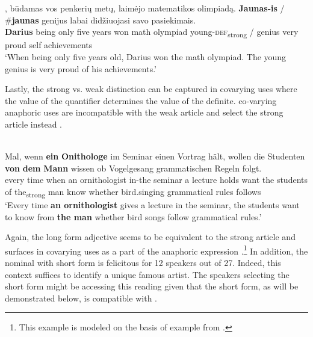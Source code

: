 \documentclass[output=paper,
modfonts
]{langscibook}
\begin{document}
\begin{exe}
	\ex \label{ex:sereikaite:42}
	, {būdamas} {vos} {penkerių} {metų}, {laimėjo} {matematikos} {olimpiadą}. \textbf{Jaunas-is} \textnormal{/} \textnormal{\#}\textbf{jaunas} {genijus} {labai} {didžiuojasi} {savo} {pasiekimais}.\\
	\textbf{Darius} being only five years won math olympiad {young-\textsc{def}\textsubscript{strong}} /  genius very proud self achievements\\
	\trans `When being only five years old, Darius won the math olympiad. The young genius is very proud of his achievements.' 
\end{exe}

Lastly, the strong vs. weak distinction can be captured in covarying uses where the value of the quantifier determines the value of the definite.  co-varying anaphoric uses are incompatible with the weak article and select the strong article instead . 

\begin{exe}
	\ex \label{ex:sereikaite:43}
	 \\
	 {Mal}, {wenn} {\textbf{ein}} {\textbf{Onithologe}} {im} {Seminar} {einen} {Vortrag} {h\"alt}, {wollen} {die} {Studenten} \textbf{von} \textbf{dem} {\textbf{Mann}} {wissen} {ob} {Vogelgesang} {grammatischen} {Regeln} {folgt}. \\
	every time when {an} {ornithologist} in-the seminar a lecture holds want the students {of} {the\textsubscript{strong}} {man} know whether bird.singing grammatical rules follows\\
	\trans `Every time \textbf{an ornithologist} gives a lecture in the seminar, the students want to know from \textbf{the man} whether bird songs follow grammatical rules.' \citep[33]{Schwarz2009}
\end{exe}

Again, the long form adjective seems to be equivalent to the  strong article and surfaces in covarying uses as a part of the anaphoric expression .\footnote{This example is modeled on the basis of  example from .} In addition, the nominal with short form is felicitous for 12 speakers out of 27. Indeed, this context suffices to identify a unique famous artist. The speakers selecting the short form might be accessing this reading given that the short form, as will be demonstrated below, is compatible with .
\end{document}
